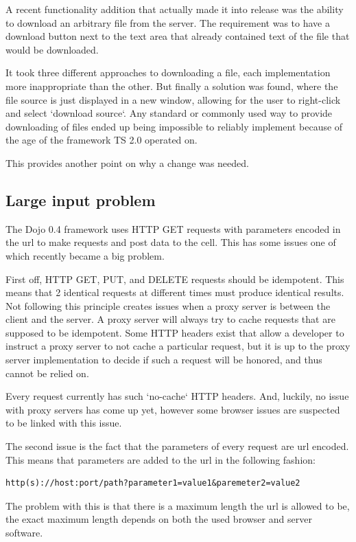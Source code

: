 A recent functionality addition that actually made it into release was the ability
to download an arbitrary file from the server.
The requirement was to have a download button next to the text area that already
contained text of the file that would be downloaded.

It took three different approaches to downloading a file, each implementation
more inappropriate than the other. But finally a solution was found, where the file source
is just displayed in a new window, allowing for the user to right-click and
select `download source`.
Any standard or commonly used way to provide downloading of files ended up being
impossible to reliably implement because of the age of the framework TS 2.0
operated on.

This provides another point on why a change was needed.

\subsection{Large input problem}
\label{Large input problem}
The Dojo 0.4 framework uses HTTP GET requests with parameters encoded in the url
to make requests and post data to the cell.
This has some issues one of which recently became a big problem.

First off, HTTP GET, PUT, and DELETE requests should be idempotent. This means
that 2 identical requests at different times must produce identical results.
Not following this principle creates issues when a proxy server is between the
client and the server. A proxy server will always try to cache requests that
are supposed to be idempotent.
Some HTTP headers exist that allow a developer to instruct a proxy server to not cache
a particular request, but it is up to the proxy server implementation to decide
if such a request will be honored, and thus cannot be relied on.

Every request currently has such `no-cache` HTTP headers. And, luckily, no issue with
proxy servers has come up yet, however some browser issues are suspected
to be linked with this issue.

The second issue is the fact that the parameters of every request are url encoded.
This means that parameters are added to the url in the following fashion:
\begin{lstlisting}
http(s)://host:port/path?parameter1=value1&paremeter2=value2
\end{lstlisting}
The problem with this is that there is a maximum length the url is allowed to be,
the exact maximum length depends on both the used browser and server software.


